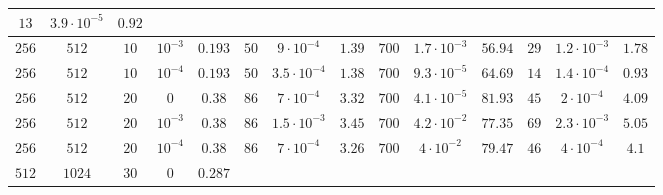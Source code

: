\documentclass[twocolumn]{svjour3}
\begin{document}
\begin{table*}
\begin{center}
\begin{tabular}{|c|c|c|c|c|c|c|c|c|c|c|c|c|c}
\multicolumn{1}{|c}{$13$} & \multicolumn{1}{c}{$3.9\cdot 10^{-5}$} & \multicolumn{1}{c}{$0.92$} \\
\hline
\multicolumn{1}{c}{$256$} & \multicolumn{1}{c}{$512$} & \multicolumn{1}{c}{$10$} & \multicolumn{1}{c|}{$10^{-3}$} & $ 0.193 $ & 
\multicolumn{1}{|c}{$50$} & \multicolumn{1}{c}{$9\cdot 10^{-4}$} & \multicolumn{1}{c|}{$1.39$} &
\multicolumn{1}{|c}{$700$} & \multicolumn{1}{c}{$1.7\cdot 10^{-3}$} & \multicolumn{1}{c|}{$56.94$} &
\multicolumn{1}{|c}{$29$} & \multicolumn{1}{c}{$1.2\cdot 10^{-3}$} & \multicolumn{1}{c}{$1.78$} \\
\hline
\multicolumn{1}{c}{$256$} & \multicolumn{1}{c}{$512$} & \multicolumn{1}{c}{$10$} & \multicolumn{1}{c|}{$10^{-4}$} & $ 0.193 $ & 
\multicolumn{1}{|c}{$50$} & \multicolumn{1}{c}{$3.5\cdot 10^{-4}$} & \multicolumn{1}{c|}{$1.38$} &
\multicolumn{1}{|c}{$700$} & \multicolumn{1}{c}{$9.3\cdot 10^{-5}$} & \multicolumn{1}{c|}{$64.69$} &
\multicolumn{1}{|c}{$14$} & \multicolumn{1}{c}{$1.4\cdot 10^{-4}$} & \multicolumn{1}{c}{$0.93$} \\
\hline
\multicolumn{1}{c}{$256$} & \multicolumn{1}{c}{$512$} & \multicolumn{1}{c}{$20$} & \multicolumn{1}{c|}{$0$} & $ 0.38 $ & 
\multicolumn{1}{|c}{$86$} & \multicolumn{1}{c}{$7\cdot 10^{-4}$} & \multicolumn{1}{c|}{$3.32$} &
\multicolumn{1}{|c}{$700$} & \multicolumn{1}{c}{$4.1\cdot 10^{-5}$} & \multicolumn{1}{c|}{$81.93$} &
\multicolumn{1}{|c}{$45$} & \multicolumn{1}{c}{$2\cdot 10^{-4}$} & \multicolumn{1}{c}{$4.09$} \\
\hline
\multicolumn{1}{c}{$256$} & \multicolumn{1}{c}{$512$} & \multicolumn{1}{c}{$20$} & \multicolumn{1}{c|}{$10^{-3}$} & $ 0.38 $ & 
\multicolumn{1}{|c}{$86$} & \multicolumn{1}{c}{$1.5\cdot 10^{-3}$} & \multicolumn{1}{c|}{$3.45$} &
\multicolumn{1}{|c}{$700$} & \multicolumn{1}{c}{$4.2\cdot 10^{-2}$} & \multicolumn{1}{c|}{$77.35$} &
\multicolumn{1}{|c}{$69$} & \multicolumn{1}{c}{$2.3\cdot 10^{-3}$} & \multicolumn{1}{c}{$5.05$} \\
\hline
\multicolumn{1}{c}{$256$} & \multicolumn{1}{c}{$512$} & \multicolumn{1}{c}{$20$} & \multicolumn{1}{c|}{$10^{-4}$} & $ 0.38 $ & 
\multicolumn{1}{|c}{$86$} & \multicolumn{1}{c}{$7\cdot 10^{-4}$} & \multicolumn{1}{c|}{$3.26$} &
\multicolumn{1}{|c}{$700$} & \multicolumn{1}{c}{$4\cdot 10^{-2}$} & \multicolumn{1}{c|}{$79.47$} &
\multicolumn{1}{|c}{$46$} & \multicolumn{1}{c}{$4\cdot 10^{-4}$} & \multicolumn{1}{c}{$4.1$} \\
\hline
\multicolumn{1}{c}{$512$} & \multicolumn{1}{c}{$1024$} & \multicolumn{1}{c}{$30$} & \multicolumn{1}{c|}{$0$} & $ 0.287 $ & 

\end{tabular}
\end{center}
\end{table*}
\end{document}
